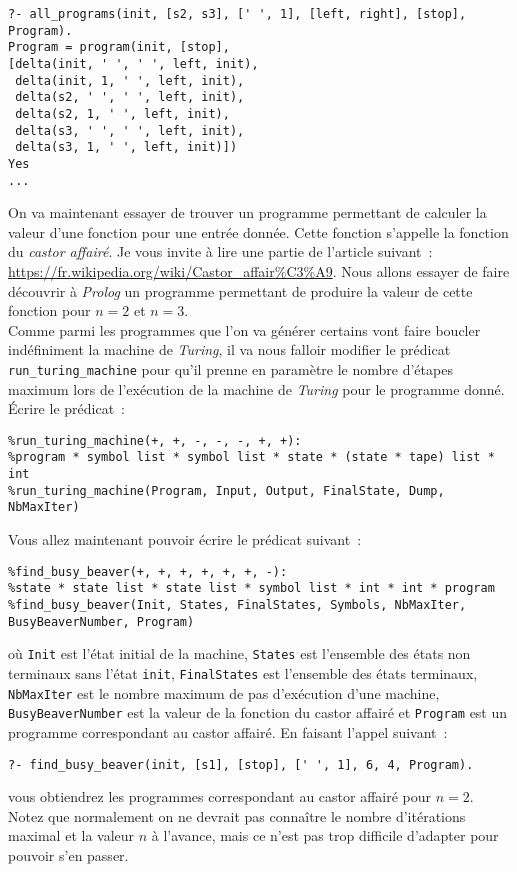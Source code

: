 \documentclass[a4paper]{article}
\begin{document}
\begin{verbatim}
?- all_programs(init, [s2, s3], [' ', 1], [left, right], [stop], Program).
Program = program(init, [stop], 
[delta(init, ' ', ' ', left, init), 
 delta(init, 1, ' ', left, init), 
 delta(s2, ' ', ' ', left, init), 
 delta(s2, 1, ' ', left, init), 
 delta(s3, ' ', ' ', left, init), 
 delta(s3, 1, ' ', left, init)])
Yes
...
\end{verbatim}

On va maintenant essayer de trouver un programme permettant de calculer la valeur d'une fonction pour une entrée donnée. Cette
fonction s'appelle la fonction du \emph{castor affairé}. Je vous invite à lire une partie de l'article suivant~: \url{https://fr.wikipedia.org/wiki/Castor_affair%C3%A9}.
Nous allons essayer de faire découvrir à \emph{Prolog} un programme permettant de produire la valeur de cette fonction pour $n = 2$ et $n = 3$.\\

Comme parmi les programmes que l'on va générer certains vont faire boucler indéfiniment la machine de \emph{Turing}, il va nous falloir modifier
le prédicat \texttt{run_turing_machine} pour qu'il prenne en paramètre le nombre d'étapes maximum lors de l'exécution de la machine de \emph{Turing}
pour le programme donné. Écrire le prédicat~:

\begin{verbatim}
%run_turing_machine(+, +, -, -, -, +, +):
%program * symbol list * symbol list * state * (state * tape) list * int 
%run_turing_machine(Program, Input, Output, FinalState, Dump, NbMaxIter)
\end{verbatim}

Vous allez maintenant pouvoir écrire le prédicat suivant~:
\begin{verbatim}
%find_busy_beaver(+, +, +, +, +, +, -): 
%state * state list * state list * symbol list * int * int * program
%find_busy_beaver(Init, States, FinalStates, Symbols, NbMaxIter, BusyBeaverNumber, Program)
\end{verbatim}
où \texttt{Init} est l'état initial de la machine, \texttt{States} est l'ensemble des états non terminaux sans l'état \texttt{init},
\texttt{FinalStates} est l'ensemble des états terminaux, \texttt{NbMaxIter} est le nombre maximum de pas d'exécution d'une machine,
\texttt{BusyBeaverNumber} est la valeur de la fonction du castor affairé et \texttt{Program} est un programme correspondant au castor affairé.
En faisant l'appel suivant~:
\begin{verbatim}
?- find_busy_beaver(init, [s1], [stop], [' ', 1], 6, 4, Program).
\end{verbatim}
vous obtiendrez les programmes correspondant au castor affairé pour $n=2$.
Notez que normalement on ne devrait pas connaître le nombre d'itérations maximal et la valeur $n$ à l'avance, mais ce n'est pas trop difficile
d'adapter pour pouvoir s'en passer.
\end{document}
